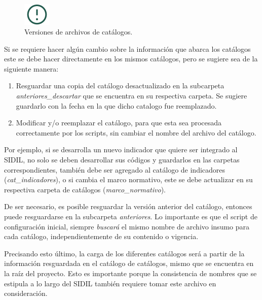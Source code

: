\documentclass[
]{article}
\begin{document}
\begin{figure}
\includegraphics[width=50px,style="float:left; background-color: #f5f5f5; padding-right:1em"]{images-1/important-icon} \caption{Versiones de archivos de catálogos.}\label{fig:cambioscatalogos}
\end{figure}

\begin{rmdcomment}
Si se requiere hacer algún cambio sobre la información que abarca los
catálogos este se debe hacer directamente en los mismos catálogos, pero
se sugiere sea de la siguiente manera:

\begin{enumerate}
\def\labelenumi{\arabic{enumi})}
\item
  Resguardar una copia del catálogo desactualizado en la subcarpeta
  \emph{anteriores\_descartar} que se encuentra en su respectiva
  carpeta. Se sugiere guardarlo con la fecha en la que dicho catalogo
  fue reemplazado.
\item
  Modificar y/o reemplazar el catálogo, para que esta sea procesada
  correctamente por los scripts, sin cambiar el nombre del archivo del
  catálogo.
\end{enumerate}

Por ejemplo, si se desarrolla un nuevo indicador que quiere ser
integrado al SIDIL, no solo se deben desarrollar sus códigos y
guardarlos en las carpetas correspondientes, también debe ser agregado
al catálogo de indicadores (\emph{cat\_indicadores}), o si cambia el
marco normativo, este se debe actualizar en su respectiva carpeta de
catálogos (\emph{marco\_normativo}).

De ser necesario, es posible resguardar la versión anterior del
catálogo, entonces puede resguardarse en la subcarpeta
\emph{anteriores}. Lo importante es que el script de configuración
inicial, siempre \emph{buscará} el mismo nombre de archivo insumo para
cada catálogo, independientemente de su contenido o vigencia.

Precisando esto último, la carga de los diferentes catálogos será a
partir de la información resguardada en el catálogo de catálogos, mismo
que se encuentra en la raíz del proyecto. Esto es importante porque la
consistencia de nombres que se estipula a lo largo del SIDIL también
requiere tomar este archivo en consideración.
\end{rmdcomment}
\end{document}
